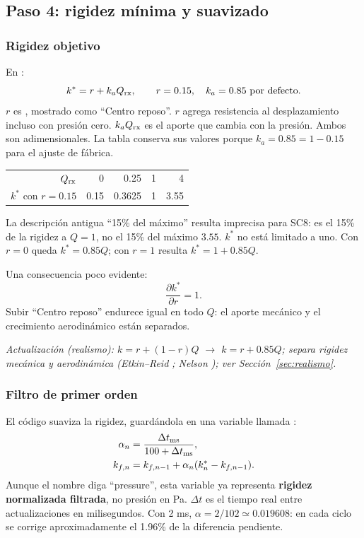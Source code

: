 \subsection{Paso 4: rigidez mínima y suavizado}
\subsubsection{Rigidez objetivo}
En :
\begin{equation}
k^*=r+k_aQ_{\rm rx},\qquad r=0.15,\quad k_a=0.85\text{ por defecto}.
\label{eq:rigidez}
\end{equation}
$r$ es , mostrado como ``Centro reposo''. $r$ agrega resistencia al desplazamiento incluso con presión cero. $k_aQ_{\rm rx}$ es el aporte que cambia con la presión. Ambos son adimensionales. La tabla conserva sus valores porque $k_a=0.85=1-0.15$ para el ajuste de fábrica.
\begin{center}
\begin{tabular}{rrrrr}
\toprule
$Q_{\rm rx}$ & 0 & 0.25 & 1 & 4\\
$k^*$ con $r=0.15$ & 0.15 & 0.3625 & 1 & 3.55\\
\bottomrule
\end{tabular}
\end{center}
La descripción antigua ``15\% del máximo'' resulta imprecisa para SC8: es el 15\% de la rigidez a $Q=1$, no el 15\% del máximo $3.55$. $k^*$ no está limitado a uno. Con $r=0$ queda $k^*=0.85Q$; con $r=1$ resulta $k^*=1+0.85Q$.

Una consecuencia poco evidente:
\begin{equation}
\frac{\partial k^*}{\partial r}=1.
\end{equation}
Subir ``Centro reposo'' endurece igual en todo $Q$: el aporte mecánico y el crecimiento aerodinámico están separados.

\textit{Actualización (realismo): $k=r+(1-r)Q$ $\rightarrow$ $k=r+0.85Q$; separa rigidez mecánica y aerodinámica (Etkin--Reid \cite{etkin1996}; Nelson \cite{nelson1998}); ver Sección~\ref{sec:realismo}.}

\subsubsection{Filtro de primer orden}
El código suaviza la rigidez, guardándola en una variable llamada :
\begin{align}
\alpha_n&=\frac{\Delta t_{\rm ms}}{100+\Delta t_{\rm ms}},\\
k_{f,n}&=k_{f,n-1}+\alpha_n(k^*_n-k_{f,n-1}).
\label{eq:filtro}
\end{align}
Aunque el nombre diga ``pressure'', esta variable ya representa \textbf{rigidez normalizada filtrada}, no presión en Pa. $\Delta t$ es el tiempo real entre actualizaciones en milisegundos. Con 2 ms, $\alpha=2/102\simeq0.019608$: en cada ciclo se corrige aproximadamente el 1.96\% de la diferencia pendiente.

